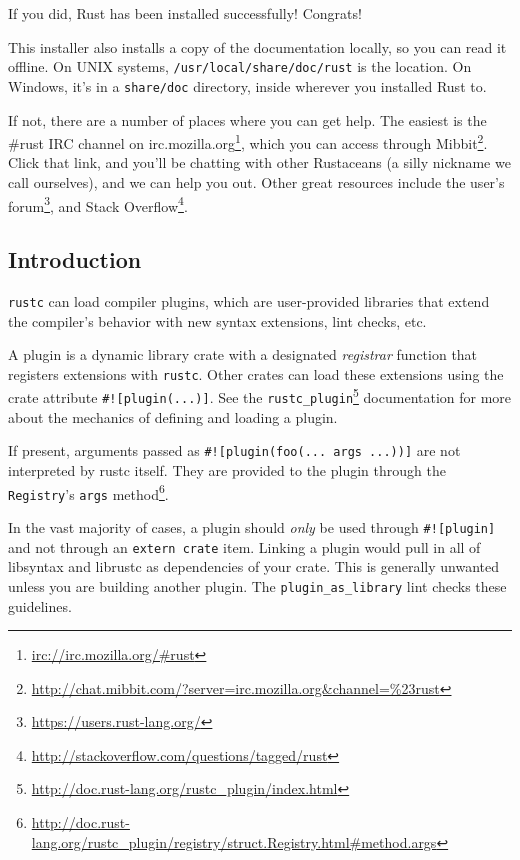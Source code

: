 \documentclass[a4paper,]{book}
\renewcommand{\href}[2]{#2\footnote{\url{#1}}}
\begin{document}
If you did, Rust has been installed successfully! Congrats!

This installer also installs a copy of the documentation locally, so you
can read it offline. On UNIX systems, \texttt{/usr/local/share/doc/rust}
is the location. On Windows, it's in a \texttt{share/doc} directory,
inside wherever you installed Rust to.

If not, there are a number of places where you can get help. The easiest
is \href{irc://irc.mozilla.org/\#rust}{the \#rust IRC channel on
irc.mozilla.org}, which you can access through
\href{http://chat.mibbit.com/?server=irc.mozilla.org\&channel=\%23rust}{Mibbit}.
Click that link, and you'll be chatting with other Rustaceans (a silly
nickname we call ourselves), and we can help you out. Other great
resources include \href{https://users.rust-lang.org/}{the user's forum},
and \href{http://stackoverflow.com/questions/tagged/rust}{Stack
Overflow}.


\subsection{Introduction}\label{introduction-2}

\texttt{rustc} can load compiler plugins, which are user-provided
libraries that extend the compiler's behavior with new syntax
extensions, lint checks, etc.

A plugin is a dynamic library crate with a designated \emph{registrar}
function that registers extensions with \texttt{rustc}. Other crates can
load these extensions using the crate attribute
\texttt{\#!{[}plugin(...){]}}. See the
\href{http://doc.rust-lang.org/rustc_plugin/index.html}{\texttt{rustc\_plugin}}
documentation for more about the mechanics of defining and loading a
plugin.

If present, arguments passed as
\texttt{\#!{[}plugin(foo(...\ args\ ...)){]}} are not interpreted by
rustc itself. They are provided to the plugin through the
\texttt{Registry}'s
\href{http://doc.rust-lang.org/rustc_plugin/registry/struct.Registry.html\#method.args}{\texttt{args}
method}.

In the vast majority of cases, a plugin should \emph{only} be used
through \texttt{\#!{[}plugin{]}} and not through an
\texttt{extern\ crate} item. Linking a plugin would pull in all of
libsyntax and librustc as dependencies of your crate. This is generally
unwanted unless you are building another plugin. The
\texttt{plugin\_as\_library} lint checks these guidelines.
\end{document}
